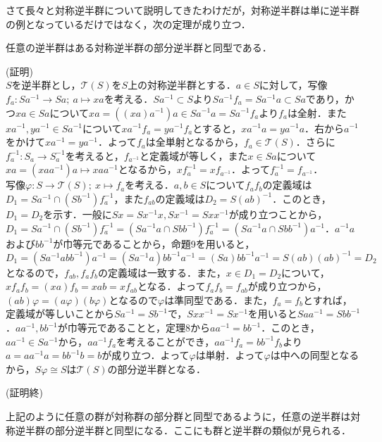 さて長々と対称逆半群について説明してきたわけだが，対称逆半群は単に逆半群の例となっているだけではなく，次の定理が成り立つ．
\begin{sthm}
任意の逆半群はある対称逆半群の部分逆半群と同型である．
\end{sthm}
(証明)\\
$S$を逆半群とし，${\mathscr T}(S)$を$S$上の対称逆半群とする．$a\in S$に対して，写像$f_a:Sa^{-1}\rightarrow Sa;\:a\mapsto xa$を考える．$Sa^{-1}\subset S$より$Sa^{-1}f_a=Sa^{-1}a\subset Sa$であり，かつ$xa\in Sa$について$xa=((xa)a^{-1})a\in Sa^{-1}a=Sa^{-1}f_a$より$f_a$は全射．また$xa^{-1},ya^{-1}\in Sa^{-1}$について$xa^{-1}f_a=ya^{-1}f_a$とすると，$xa^{-1}a=ya^{-1}a$．右から$a^{-1}$をかけて$xa^{-1}=ya^{-1}$．よって$f_a$は全単射となるから，$f_a\in{\mathscr T}(S)$．さらに$f_a^{-1}:S_a\rightarrow S_a^{-1}$を考えると，$f_{a^{-1}}$と定義域が等しく，また$x\in Sa$について$xa=(xaa^{-1})a\mapsto xaa^{-1}$となるから，$xf_a^{-1}=xf_{a^{-1}}$．よって$f_a^{-1}=f_{a^{-1}}$．\\
写像$\varphi:S\rightarrow{\mathscr T}(S);\:x\mapsto f_a$を考える．$a,b\in S$について$f_af_b$の定義域は$D_1=Sa^{-1}\cap (Sb^{-1})f_a^{-1}$，また$f_{ab}$の定義域は$D_2=S(ab)^{-1}$．このとき，$D_1=D_2$を示す．一般に$Sx=Sx^{-1}x,Sx^{-1}=Sxx^{-1}$が成り立つことから，$D_1=Sa^{-1}\cap (Sb^{-1})f_a^{-1}=(Sa^{-1}a\cap Sbb^{-1})f_a^{-1}=(Sa^{-1}a\cap Sbb^{-1})a^{-1}$．$a^{-1}a$および$bb^{-1}$が巾等元であることから，命題9を用いると，$D_1=(Sa^{-1}abb^{-1})a^{-1}=(Sa^{-1}a)bb^{-1}a^{-1}=(Sa)bb^{-1}a^{-1}=S(ab)(ab)^{-1}=D_2$となるので，$f_{ab},f_af_b$の定義域は一致する．また，$x\in D_1=D_2$について，
$xf_af_b=(xa)f_b=xab=xf_{ab}$となる．よって$f_af_b=f_{ab}$が成り立つから，$(ab)\varphi=(a\varphi)(b\varphi)$となるので$\varphi$は準同型である．また，$f_a=f_b$とすれば，定義域が等しいことから$Sa^{-1}=Sb^{-1}$で，$Sxx^{-1}=Sx^{-1}$を用いると$Saa^{-1}=Sbb^{-1}$．$aa^{-1},bb^{-1}$が巾等元であることと，定理8から$aa^{-1}=bb^{-1}$．このとき，$aa^{-1}\in Sa^{-1}$から，$aa^{-1}f_a$を考えることができ，$aa^{-1}f_a=bb^{-1}f_b$より$a=aa^{-1}a=bb^{-1}b=b$が成り立つ．よって$\varphi$は単射．よって$\varphi$は中への同型となるから，$S\varphi\cong S$は${\mathscr T}(S)$の部分逆半群となる．
\begin{flushright}
(証明終)
\end{flushright}
上記のように任意の群が対称群の部分群と同型であるように，任意の逆半群は対称逆半群の部分逆半群と同型になる．ここにも群と逆半群の類似が見られる．
